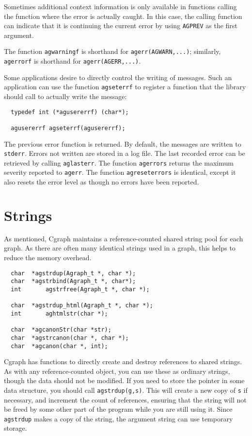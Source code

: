 \documentclass[11pt,letterpaper]{article}
\begin{document}
Sometimes additional context information is only available in functions calling the function 
where the error is actually caught. In this case, the calling function can indicate that it 
is continuing the current error by using \verb"AGPREV" as the first argument.

The function \verb"agwarningf" is shorthand for \verb"agerr(AGWARN,...)"; similarly,
\verb"agerrorf" is shorthand for \verb"agerr(AGERR,...)".

Some applications desire to directly control the writing of messages. Such an application can 
use the function \verb"agseterrf" to register a function that the library should call to actually 
write the message:
\begin{verbatim}
  typedef int (*agusererrf) (char*);

  agusererrf agseterrf(agusererrf);
\end{verbatim}
The previous error function is returned. By default, the messages are written to \verb"stderr".
Errors not written are stored in a log file. The last recorded error can be retrieved by 
calling \verb"aglasterr".
The function \verb"agerrors" returns the maximum severity reported to \verb"agerr".
The function \verb"agreseterrors" is identical, except it also resets the error level
as though no errors have been reported.

\section{Strings}
\label{sec:strings}
As mentioned, Cgraph maintains a reference-counted shared string pool for each graph.  
As there are often many identical strings used in a graph, this helps to reduce the
memory overhead. 
\begin{verbatim}
  char	*agstrdup(Agraph_t *, char *);
  char	*agstrbind(Agraph_t *, char*);
  int		agstrfree(Agraph_t *, char *);

  char	*agstrdup_html(Agraph_t *, char *);
  int		aghtmlstr(char *);
  
  char	*agcanonStr(char *str);
  char	*agstrcanon(char *, char *);
  char	*agcanon(char *, int);
\end{verbatim}
Cgraph has functions to directly create and destroy references to shared strings.
As with any reference-counted object, you can use these as ordinary
strings, though the data should not be modified. If you need to store the pointer
in some data structure, you should call \verb"agstrdup(g,s)". This will create a 
new copy of \verb"s" if necessary, and increment
the count of references, ensuring that the string will not be freed by some
other part of the program while you are still using it. Since  \verb"agstrdup" makes
a copy of the string, the argument string can use temporary storage.
\end{document}
